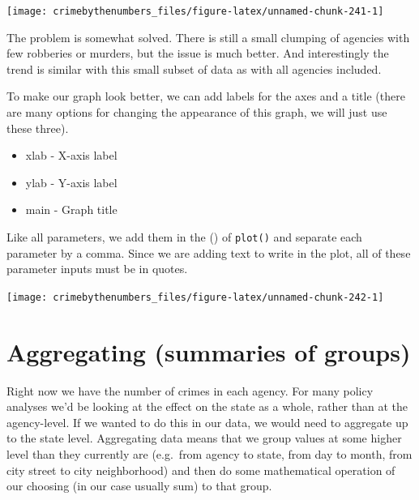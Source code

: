 \documentclass[
]{krantz}
\makeatletter
\newenvironment{Shaded}{\begin{snugshade}}{\end{snugshade}}
\newcommand{\AttributeTok}[1]{\textcolor[rgb]{0.61,0.61,0.61}{#1}}
\newcommand{\FunctionTok}[1]{\textcolor[rgb]{0,0,0}{#1}}
\newcommand{\NormalTok}[1]{#1}
\newcommand{\SpecialCharTok}[1]{\textcolor[rgb]{0,0,0}{#1}}
\newcommand{\StringTok}[1]{\textcolor[rgb]{0.5,0.5,0.5}{#1}}
\providecommand{\tightlist}{%
  \setlength{\itemsep}{0pt}\setlength{\parskip}{0pt}}
\newenvironment{kframe}{%
\medskip{}
\setlength{\fboxsep}{.8em}
 \def\at@end@of@kframe{}%
 \ifinner\ifhmode%
  \def\at@end@of@kframe{\end{minipage}}%
  \begin{minipage}{\columnwidth}%
 \fi\fi%
 \def\FrameCommand##1{\hskip\@totalleftmargin \hskip-\fboxsep
 \colorbox{shadecolor}{##1}\hskip-\fboxsep
     \hskip-\linewidth \hskip-\@totalleftmargin \hskip\columnwidth}%
 \MakeFramed {\advance\hsize-\width
   \@totalleftmargin\z@ \linewidth\hsize
   \@setminipage}}%
 {\par\unskip\endMakeFramed%
 \at@end@of@kframe}
\renewenvironment{Shaded}{\begin{kframe}}{\end{kframe}}
\makeatother
\begin{document}
\begin{center}\texttt{[image: crimebythenumbers\_files/figure-latex/unnamed-chunk-241-1]} \end{center}

The problem is somewhat solved. There is still a small
clumping of agencies with few robberies or murders, but the
issue is much better. And interestingly the trend is similar
with this small subset of data as with all agencies
included.

To make our graph look better, we can add labels for the
axes and a title (there are many options for changing the
appearance of this graph, we will just use these three).

\begin{itemize}
\tightlist
\item
  xlab - X-axis label
\item
  ylab - Y-axis label
\item
  main - Graph title
\end{itemize}

Like all parameters, we add them in the () of
\texttt{plot()} and separate each parameter by a comma.
Since we are adding text to write in the plot, all of these
parameter inputs must be in quotes.

\begin{Shaded}
\end{Shaded}

\begin{center}\texttt{[image: crimebythenumbers\_files/figure-latex/unnamed-chunk-242-1]} \end{center}

\hypertarget{aggregate}{%
\section{Aggregating (summaries of
groups)}\label{aggregate}}

Right now we have the number of crimes in each agency. For
many policy analyses we'd be looking at the effect on the
state as a whole, rather than at the agency-level. If we
wanted to do this in our data, we would need to aggregate up
to the state level. Aggregating data means that we group
values at some higher level than they currently are
(e.g.~from agency to state, from day to month, from city
street to city neighborhood) and then do some mathematical
operation of our choosing (in our case usually sum) to that
group.
\end{document}

